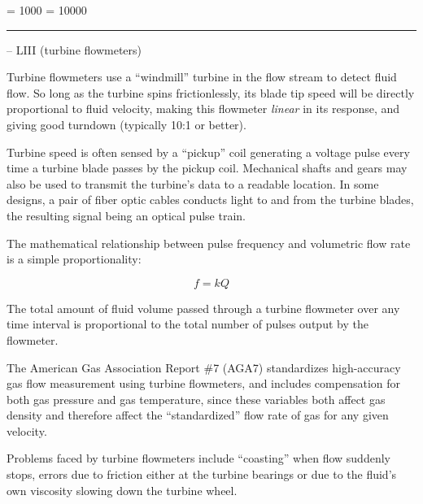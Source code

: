 



\tolerance = 1000
\pretolerance = 10000

\vskip 5pt \hrule \vskip 5pt  -- LIII (turbine flowmeters) \vskip 10pt

Turbine flowmeters use a ``windmill'' turbine in the flow stream to detect fluid flow.  So long as the turbine spins frictionlessly, its blade tip speed will be directly proportional to fluid velocity, making this flowmeter {\it linear} in its response, and giving good turndown (typically 10:1 or better).

\vskip 10pt

Turbine speed is often sensed by a ``pickup'' coil generating a voltage pulse every time a turbine blade passes by the pickup coil.  Mechanical shafts and gears may also be used to transmit the turbine's data to a readable location.  In some designs, a pair of fiber optic cables conducts light to and from the turbine blades, the resulting signal being an optical pulse train.

\vskip 10pt

The mathematical relationship between pulse frequency and volumetric flow rate is a simple proportionality:

$$f = kQ$$

The total amount of fluid volume passed through a turbine flowmeter over any time interval is proportional to the total number of pulses output by the flowmeter.

\vskip 10pt

The American Gas Association Report \#7 (AGA7) standardizes high-accuracy gas flow measurement using turbine flowmeters, and includes compensation for both gas pressure and gas temperature, since these variables both affect gas density and therefore affect the ``standardized'' flow rate of gas for any given velocity.

\vskip 10pt

Problems faced by turbine flowmeters include ``coasting'' when flow suddenly stops, errors due to friction either at the turbine bearings or due to the fluid's own viscosity slowing down the turbine wheel.



